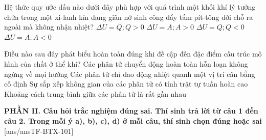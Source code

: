 \begin{ex}	Hệ thức quy ước dấu nào dưới đây phù hợp với quá trình một khối khí lý tưởng chứa trong một xi-lanh kín đang giãn nở sinh công đẩy tấm pít-tông dời chỗ ra ngoài mà không nhận nhiệt?
	\choice
	{$\Delta U=Q; Q>0$}
	{$\Delta U=A; A>0$}
	{$\Delta U=Q; Q<0$}
	{\True $\Delta U=A; A<0$}
\end{ex}

\begin{ex}	Điều nào sau đây phát biểu hoàn toàn đúng khi đề cập đến đặc điểm cấu trúc mô hình của chất ở thể khí?
	\choice
	{\True Các phân tử chuyển động hoàn toàn hỗn loạn không ngừng về mọi hướng}
	{Các phân tử chỉ dao động nhiệt quanh một vị trí cân bằng cố định}
	{Sự sắp xếp không gian của các phân tử có tính trật tự tuần hoàn cao}
	{Khoảng cách trung bình giữa các phân tử là rất gần nhau}
\end{ex}


\noindent \textbf{PHẦN II. Câu hỏi trắc nghiệm đúng sai. Thí sinh trả lời từ câu 1 đến câu 2. Trong mỗi ý a), b), c), d) ở mỗi câu, thí sinh chọn đúng hoặc sai}
[ans/ansTF-BTX-101]

